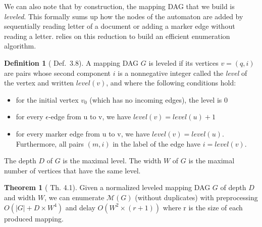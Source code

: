 \documentclass[11px]{article}
\theoremstyle{definition}
\newtheorem{definition}{Definition}
\newtheorem{theorem}{Theorem}
\begin{document}
        We can also note that by construction, the mapping DAG that we build is
        \textit{leveled}. This formally sums up how the nodes of the automaton
        are added by sequentially reading letter of a document or adding a
        marker edge without reading a letter. \cite{ICDT19} relies on this
        reduction to build an efficient enumeration algorithm.

        \begin{definition}[\cite{ICDT19} Def.\ 3.8]
          A mapping DAG $G$ is leveled if its vertices $v = (q, i)$ are pairs
          whose second component $i$ is a nonnegative integer called the
          \textit{level} of the vertex and written $level(v)$, and where the
          following conditions hold:
            \begin{itemize}
              \item for the initial vertex $v_0$ (which has no incoming edges),
                the level is $0$
              \item for every $\epsilon$-edge from u to v, we have $level(v) =
                level(u) + 1$
              \item for every marker edge from u to v, we have $level(v) =
                level(u)$. Furthermore, all pairs $(m, i)$ in the label of the
                edge have $i = level(v)$.
            \end{itemize}

          The depth $D$ of $G$ is the maximal level. The width $W$ of $G$ is
          the maximal number of vertices that have the same level.
        \end{definition}

        \begin{theorem}[\cite{ICDT19} Th. 4.1]
          Given a normalized leveled mapping DAG $G$ of depth $D$ and width
          $W$, we can enumerate $\mathcal{M}(G)$ (without duplicates) with
          preprocessing $O(|G| + D \times W^4 )$ and delay $O(W^2 \times (r +
          1))$ where r is the size of each produced mapping.
        \end{theorem}
\end{document}
